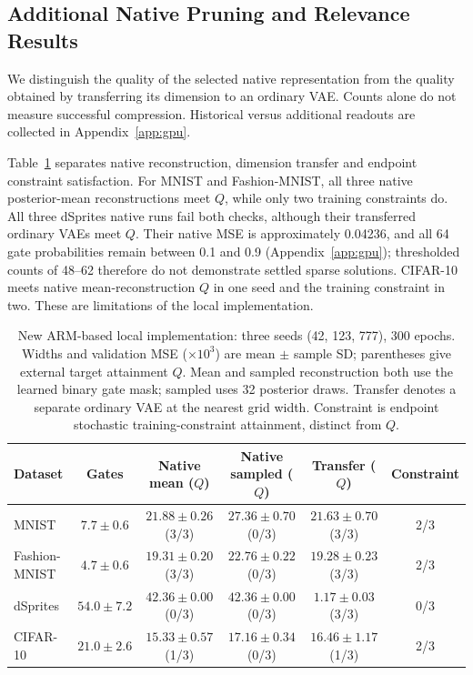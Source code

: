 \documentclass[make,article,submit,pdftex,moreauthors]{Definitions/mdpi}
\begin{document}
\subsection{Additional Native Pruning and Relevance Results}\label{sec:newpruning}
We distinguish the quality of the selected native representation from
the quality obtained by transferring its dimension to an ordinary VAE.
Counts alone do not measure successful compression. Historical versus
additional readouts are collected in Appendix~\ref{app:gpu}.

Table~\ref{tab:armnew} separates native reconstruction, dimension transfer
and endpoint constraint satisfaction. For MNIST and Fashion-MNIST,
all three native posterior-mean reconstructions meet $Q$, while only
two training constraints do. All three dSprites native runs fail both
checks, although their transferred ordinary VAEs meet $Q$. Their native
MSE is approximately 0.04236, and all 64 gate probabilities remain
between 0.1 and 0.9 (Appendix~\ref{app:gpu}); thresholded counts of 48--62
therefore do not demonstrate settled sparse solutions. CIFAR-10 meets
native mean-reconstruction $Q$ in one seed and the training constraint
in two. These are limitations of the local implementation.
\begin{table}[H]
\caption{New ARM-based local implementation: three seeds (42, 123, 777), 300 epochs. Widths and validation MSE ($\times10^3$) are mean $\pm$ sample SD; parentheses give external target attainment $Q$. Mean and sampled reconstruction both use the learned binary gate mask; sampled uses 32 posterior draws. Transfer denotes a separate ordinary VAE at the nearest grid width. Constraint is endpoint stochastic training-constraint attainment, distinct from $Q$.}\label{tab:armnew}
\footnotesize
\setlength{\tabcolsep}{3pt}
\begin{tabular*}{\textwidth}{@{\extracolsep{\fill}}lccccc@{}}
\toprule
Dataset & Gates & Native mean ($Q$) & Native sampled ($Q$) & Transfer ($Q$) & Constraint \\
\midrule
MNIST & $7.7 \pm 0.6$ & $21.88 \pm 0.26$ (3/3) & $27.36 \pm 0.70$ (0/3) & $21.63 \pm 0.70$ (3/3) & 2/3 \\
Fashion-MNIST & $4.7 \pm 0.6$ & $19.31 \pm 0.20$ (3/3) & $22.76 \pm 0.22$ (0/3) & $19.28 \pm 0.23$ (3/3) & 2/3 \\
dSprites & $54.0 \pm 7.2$ & $42.36 \pm 0.00$ (0/3) & $42.36 \pm 0.00$ (0/3) & $1.17 \pm 0.03$ (3/3) & 0/3 \\
CIFAR-10 & $21.0 \pm 2.6$ & $15.33 \pm 0.57$ (1/3) & $17.16 \pm 0.34$ (0/3) & $16.46 \pm 1.17$ (1/3) & 2/3 \\
\bottomrule\end{tabular*}
\end{table}
\end{document}
